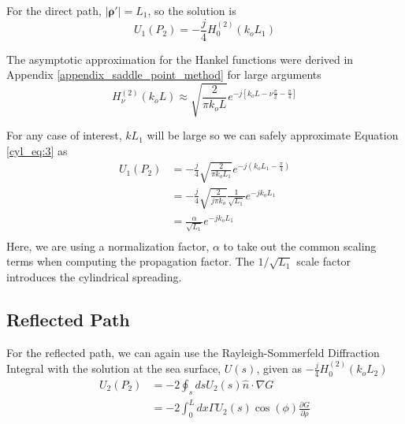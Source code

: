 \noindent For the direct path, $|\boldsymbol{\rho}'| = L_1$, so the  solution is
\begin{equation}
U_1(P_2) =-\frac{j}{4}H_0^{(2)}\left(k_oL_1 \right)
\label{cyl_eq:3}
\end{equation}
\renewcommand{\baselinestretch}{2} \small\normalsize

The asymptotic approximation for the Hankel functions were derived in Appendix \ref{appendix_saddle_point_method} for large arguments
\begin{equation}
H_{\nu}^{(2)}(k_oL) \approx \sqrt{\frac{2}{\pi k_o L}}e^{-j\left[k_oL - \nu\frac{\pi}{2} - \frac{\pi}{4}\right]}
\label{cyl_eq:4}
\end{equation}
\renewcommand{\baselinestretch}{2} \small\normalsize

\noindent For any case of interest, $kL_1$ will be large so we can safely approximate Equation \ref{cyl_eq:3} as
\begin{equation}
\begin{aligned}
U_1(P_2) &=-\frac{j}{4}\sqrt{\frac{2}{\pi k_o L_1}}e^{-j(k_oL_1 - \frac{\pi}{4})}\\
&=-\frac{j}{4}\sqrt{\frac{2}{j\pi k_o}}\frac{1}{\sqrt{L_1}}e^{-jk_oL_1 }\\
&=\frac{\alpha}{\sqrt{L_1}}e^{-jk_oL_1 }\\
\label{cyl_eq:5}
\end{aligned}
\end{equation}
\renewcommand{\baselinestretch}{2} \small\normalsize
Here, we are using a normalization factor, $\alpha$ to take out the common scaling terms when computing the propagation factor. The $1/\sqrt{L_1}$ scale factor introduces the cylindrical spreading.

\subsection{Reflected Path}
For the reflected path, we can again use the Rayleigh-Sommerfeld Diffraction Integral with the solution at the sea surface, $U(s)$, given as $-\frac{j}{4}H_0^{(2)}\left(k_oL_2 \right)$
\begin{equation}
\begin{aligned}
U_2(P_2) &= -2\oint_s ds U_2(s)\hat{n}\cdot\nabla G\\
&= -2\int_0^L dx \Gamma U_2(s)\cos(\phi)\frac{\partial G}{\partial \rho}\\
\end{aligned}
\label{cyl_eq:6}
\end{equation}


